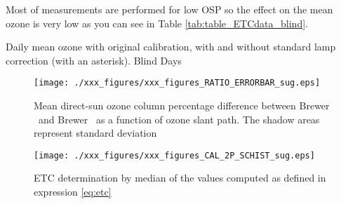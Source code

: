 Most of measurements are performed for low OSP so the effect on the mean ozone is very low as you can see in Table \ref{tab:table_ETCdata_blind}.


\begin{table}[hbp!] \centering
		\caption{Daily mean ozone with original calibration, with and without standard lamp correction (with an asterisk). Blind Days}
		\label{tab:table_ETCdata_blind}
		
\end{table}


\begin{figure}[hbtp!]
\begin{center}   
		\texttt{[image: ./xxx\_figures/xxx\_figures\_RATIO\_ERRORBAR\_sug.eps]}
		\caption{Mean direct-sun ozone column percentage difference between Brewer \brwname\ and Brewer \brwref\ as a function of ozone slant path. The shadow areas represent standard deviation}
		\label{fig:RATIO_ERRORBAR_blind}
\end{center}
\end{figure}

\begin{figure}[hbtp!]
\begin{center}
		\texttt{[image: ./xxx\_figures/xxx\_figures\_CAL\_2P\_SCHIST\_sug.eps]}
		\caption{ETC determination by median of the values computed as defined in expression \ref{eq:etc}}
		\label{fig:CAL_2P_SCHIST_blind}
\end{center}
\end{figure}


